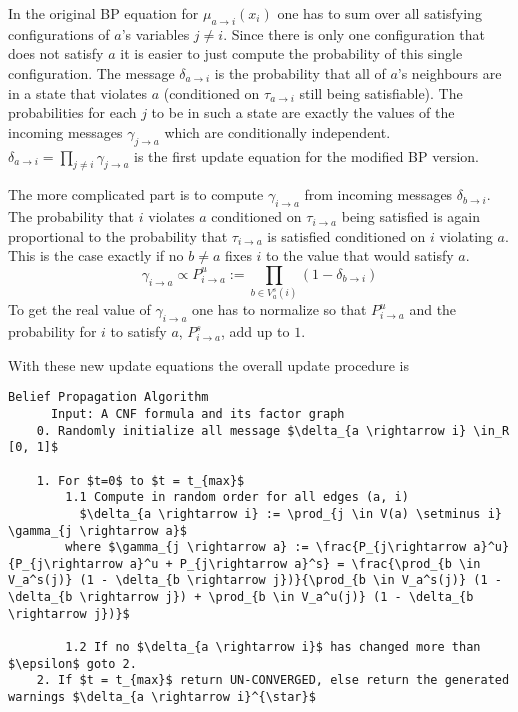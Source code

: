 In the original BP equation for $\mu_{a \rightarrow i}(x_i)$ one has to sum over all satisfying configurations of $a$'s variables $j \neq i$. Since there is only one configuration that does not satisfy $a$ it is easier to just compute the probability of this single configuration. The message $\delta_{a \rightarrow i}$ is the probability that all of $a$'s neighbours are in a state that violates $a$ (conditioned on $\tau_{a \rightarrow i}$ still being satisfiable). The probabilities for each $j$ to be in such a state are exactly the values of the incoming messages $\gamma_{j \rightarrow a}$ which are conditionally independent.
$\delta_{a \rightarrow i} = \prod_{j \neq i} \gamma_{j \rightarrow a}$ is the first update equation for the modified BP version.

The more complicated part is to compute $\gamma_{i \rightarrow a}$ from incoming messages $\delta_{b \rightarrow i}$. The probability that $i$ violates $a$ conditioned on $\tau_{i \rightarrow a}$ being satisfied is again proportional to the probability  that $\tau_{i \rightarrow a}$ is satisfied conditioned on $i$ violating $a$. This is the case exactly if no $b \neq a$ fixes $i$ to the value that would satisfy $a$.
$$\gamma_{i \rightarrow a} \propto P_{i \rightarrow a}^u := \prod_{b \in V_a^s(i)} (1 - \delta_{b \rightarrow i})$$
To get the real value of $\gamma_{i \rightarrow a}$ one has to normalize so that $P_{i \rightarrow a}^u$ and the probability for $i$ to satisfy $a$, $P_{i \rightarrow a}^s$, add up to $1$.

With these new update equations the overall update procedure is

\begin{lstlisting}[mathescape=true, frame = single]
	Belief Propagation Algorithm
	  Input: A CNF formula and its factor graph
	0. Randomly initialize all message $\delta_{a \rightarrow i} \in_R [0, 1]$
	
	1. For $t=0$ to $t = t_{max}$
		1.1 Compute in random order for all edges (a, i)
		  $\delta_{a \rightarrow i} := \prod_{j \in V(a) \setminus i} \gamma_{j \rightarrow a}$		 
		where $\gamma_{j \rightarrow a} := \frac{P_{j\rightarrow a}^u}{P_{j\rightarrow a}^u + P_{j\rightarrow a}^s} = \frac{\prod_{b \in V_a^s(j)} (1 - \delta_{b \rightarrow j})}{\prod_{b \in V_a^s(j)} (1 - \delta_{b \rightarrow j}) + \prod_{b \in V_a^u(j)} (1 - \delta_{b \rightarrow j})}$
		 		
		1.2 If no $\delta_{a \rightarrow i}$ has changed more than $\epsilon$ goto 2.
	2. If $t = t_{max}$ return UN-CONVERGED, else return the generated warnings $\delta_{a \rightarrow i}^{\star}$
\end{lstlisting}

